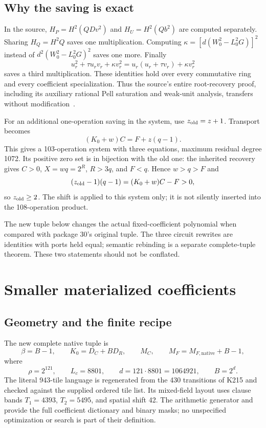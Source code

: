 \documentclass[11pt]{article}
\theoremstyle{definition}\newtheorem{definition}[theorem]{Definition}
\newcommand{\smallpath}[1]{{\small\path{#1}}}
\begin{document}
\subsection{Why the saving is exact}
In the source, $H_P=H^2(QDv^2)$ and $H_U=H^2(Qb^2)$ are computed separately. Sharing $H_Q=H^2Q$ saves one multiplication. Computing $\kappa=[d(W_0^2-L_0^2G)]^2$ instead of $d^2(W_0^2-L_0^2G)^2$ saves one more. Finally
\[
 u_r^2+\tau u_rv_r+\kappa v_r^2
 =u_r(u_r+\tau v_r)+\kappa v_r^2
\]
saves a third multiplication. These identities hold over every commutative ring and every coefficient specialization. Thus the source's entire root-recovery proof, including its auxiliary rational Pell saturation and weak-unit analysis, transfers without modification~\cite{positive30}.

For an additional one-operation saving in the system, use $z_{\rm old}=z+1$. Transport becomes
\[
 (K_0+w)C=F+z(q-1).
\]
This gives a 103-operation system with three equations, maximum residual degree 1072. Its positive zero set is in bijection with the old one: the inherited recovery gives $C>0$, $X=wq=2^R$, $R>3q$, and $F<q$. Hence $w>q>F$ and
\[
 (z_{\rm old}-1)(q-1)=(K_0+w)C-F>0,
\]
so $z_{\rm old}\ge2$. The shift is applied to this system only; it is not silently inserted into the 108-operation product.

The new tuple below changes the actual fixed-coefficient polynomial when compared with package 30's original tuple. The three circuit rewrites are identities with ports held equal; semantic rebinding is a separate complete-tuple theorem. These two statements should not be conflated.

\section{Smaller materialized coefficients}\label{sec:coeff}
\subsection{Geometry and the finite recipe}
The new complete native tuple is
\[
 \beta=B-1,\qquad K_0=D_C+BD_R,\qquad M_C,
 \qquad M_F=M_{F,\mathrm{native}}+B-1,
\]
where
\begin{equation}\label{eq:newbase}
 \rho=2^{121},\qquad L_c=8801,\qquad
 d=121\cdot8801=1064921,\qquad B=2^d.
\end{equation}
The literal 943-tile language is regenerated from the 430 transitions of K215 and checked against the supplied ordered tile list. Its mixed-field layout uses clause bands $T_1=4393$, $T_2=5495$, and spatial shift 42. The arithmetic generator and \smallpath{compiler/COEFFICIENT_PROOF.md} provide the full coefficient dictionary and binary masks; no unspecified optimization or search is part of their definition.
\end{document}
